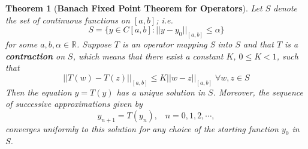 \documentclass{article}
\newtheorem{theorem}{Theorem}[section]
\theoremstyle{definition}
\theoremstyle{remark}
\theoremstyle{example}
\begin{document}
\begin{theorem}[\textbf{Banach Fixed Point Theorem for Operators}]\cite{r_kent_nagle_fundamentals_2011}\label{thm:BFPTO}
    Let $S$ denote the set of continuous functions on $[a,b]$; i.e.
    \begin{equation}
        S = \{y\in C[a,b]:\lvert\lvert y - y_0\rvert\rvert_{[a,b]} \leq \alpha\}
    \end{equation}
    for some $a, b, \alpha\in \mathbb{R}$. Suppose $T$ is an operator mapping S into $S$ and that $T$ is a \textbf{contraction} on $S$, which means that there exist a constant $K$, $0\leq K < 1$, such that 
\begin{equation}\label{eqn:contractionO}
    \lvert\lvert T(w) - T(z) \rvert\rvert_{[a,b]} \leq K\lvert\lvert w - z \rvert\rvert_{[a,b]}\; \forall w,z \in S
\end{equation}
Then the equation $y = T(y)$ has a unique solution in $S$. Moreover, the sequence of successive approximations given by
\begin{equation}\label{eqn:ssoex}
    y_{n+1} = T(y_n), \; \; \; n = 0, 1, 2, \cdots,
\end{equation}
converges uniformly to this solution for any choice of the starting function $y_0$ in $S$.
\end{theorem}
\end{document}
